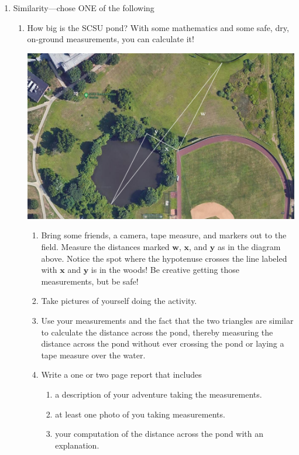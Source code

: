 \begin{enumerate}

\item Similarity---chose ONE of the following
\begin{enumerate}
\item How big is the SCSU pond? With some mathematics and some safe, dry, on-ground measurements, you can calculate it! 
\begin{center}
    \includegraphics[width=5.5in]{images/SCSU Pond}
\end{center}
\begin{enumerate}
\item Bring some friends, a camera, tape measure, and markers out to the field. Measure the distances marked $\mathbf w$, $\mathbf x$, and $\mathbf y$ as in the diagram above. Notice the spot where the hypotenuse crosses the line labeled with $\mathbf x$ and $\mathbf y$ is in the woods! Be creative getting those measurements, but be safe!
\item Take pictures of yourself doing the activity.
\item Use your measurements and the fact that the two triangles are similar to calculate the distance across the pond, thereby measuring the distance across the pond without ever crossing the pond or laying a tape measure over the water.
\item Write a one or two page report that includes
\begin{enumerate}
    \item a description of your adventure taking the measurements.
    \item at least one photo of you taking measurements.
    \item your computation of the distance across the pond with an explanation.
\end{enumerate}


\end{enumerate}
\end{enumerate}
\end{enumerate}
